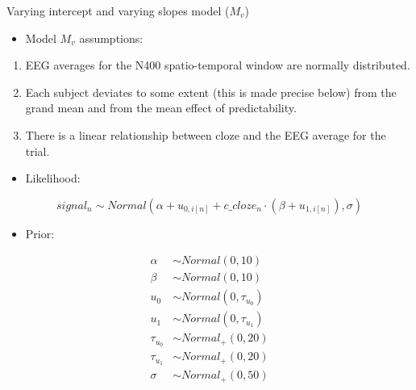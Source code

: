 \documentclass[12pt,ignorenonframetext,aspectratio=169]{beamer}
\providecommand{\tightlist}{%
  \setlength{\itemsep}{0pt}\setlength{\parskip}{0pt}}
\begin{document}
\begin{frame}{Varying intercept and varying slopes model (\(M_{v}\))}
\protect\hypertarget{varying-intercept-and-varying-slopes-model-m_v}{}

\begin{itemize}
\tightlist
\item
  Model \(M_{v}\) assumptions:
\end{itemize}

\begin{enumerate}
\tightlist
\item
  EEG averages for the N400 spatio-temporal window are normally distributed.
\item
  Each subject deviates to some extent (this is made precise below) from the grand mean and from the mean effect of predictability.
\item
  There is a linear relationship between cloze and the EEG average for the trial.
\end{enumerate}

\end{frame}

\begin{frame}

\begin{itemize}
\tightlist
\item
  Likelihood:
\end{itemize}

\begin{equation}
 signal_n \sim Normal(\alpha + u_{0,i[n]} + c\_cloze_n \cdot (\beta+ u_{1,i[n]}),\sigma)
 \end{equation}

\begin{itemize}
\tightlist
\item
  Prior:
\end{itemize}

\begin{equation}
 \begin{aligned}
 \alpha &\sim Normal(0,10)\\
 \beta  &\sim Normal(0,10)\\
 u_0 &\sim Normal(0,\tau_{u_0})\\
 u_1 &\sim Normal(0,\tau_{u_1})\\
 \tau_{u_0} &\sim Normal_+(0,20) \\
 \tau_{u_1} &\sim Normal_+(0,20) \\
 \sigma  &\sim Normal_+(0,50)
 \end{aligned}
 \end{equation}

\end{frame}
\end{document}
